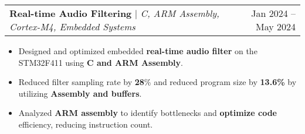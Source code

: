 \documentclass[A4,10pt]{article}
\makeatletter
\newcommand{\resumeItem}[1]{
  \item\small{
    {#1 \vspace{-2pt}}
  }
}
\newcommand{\resumeProjectHeading}[2]{
    \item
    \begin{tabular*}{0.97\textwidth}{l@{\extracolsep{\fill}}r}
      \small#1 & #2 \\
    \end{tabular*}\vspace{-7pt}
}
\newcommand{\resumeItemListStart}{\begin{itemize}}
\newcommand{\resumeItemListEnd}{\end{itemize}\vspace{-5pt}}
\makeatother
\begin{document}
      \resumeProjectHeading
        {\textbf{Real-time Audio Filtering} $|$ \emph{C, ARM Assembly, Cortex-M4, Embedded Systems}}{Jan 2024 -- May 2024}
        \resumeItemListStart
          \resumeItem{Designed and optimized embedded \textbf{real-time audio filter} on the STM32F411 using \textbf{C and ARM Assembly}.}
          \resumeItem{Reduced filter sampling rate by \textbf{28}\% and reduced program size by \textbf{13.6\%} by utilizing \textbf{Assembly and buffers}.}%
          \resumeItem{Analyzed \textbf{ARM assembly} to identify bottlenecks and \textbf{optimize code} efficiency, reducing instruction count.}
      \resumeItemListEnd

\end{document}
